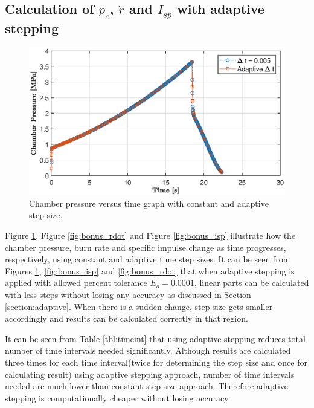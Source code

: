 \documentclass[letterpaper,12pt]{article}
\begin{document}
\newpage
\subsection{Calculation of $p_c$, $\dot{r}$ and $I_{sp}$ with adaptive stepping}

\begin{figure}[!h]
	\centering
	\includegraphics[height = 8.5 cm]{graphs/bonus_pc.eps}
	\caption{Chamber pressure versus time graph with constant and adaptive step size.}
	\label{fig:bonus_cp}
\end{figure}

Figure \ref{fig:bonus_cp}, Figure \ref{fig:bonus_rdot} and Figure \ref{fig:bonus_isp} illustrate how the chamber pressure, 
burn rate and specific impulse change as time progresses, respectively, using constant and adaptive time step sizes.
It can be seen from Figures \ref{fig:bonus_cp}, \ref{fig:bonus_isp} and \ref{fig:bonus_rdot} that when adaptive stepping is 
applied with allowed percent tolerance $E_o = 0.0001$, linear parts can be calculated with less steps without losing any accuracy as discussed in 
Section \ref{section:adaptive}. When there is a sudden change, step size gets smaller accordingly and results can be calculated correctly in that region.

It can be seen from Table \ref{tbl:timeint} that using adaptive stepping reduces total number of time intervals needed significantly.
Although results are calculated three times for each time interval(twice for determining the step size and once for calculating result) 
using adaptive stepping approach, number of time intervals needed are much lower than constant step size approach. Therefore adaptive stepping is 
computationally cheaper without losing accuracy. 
\end{document}
